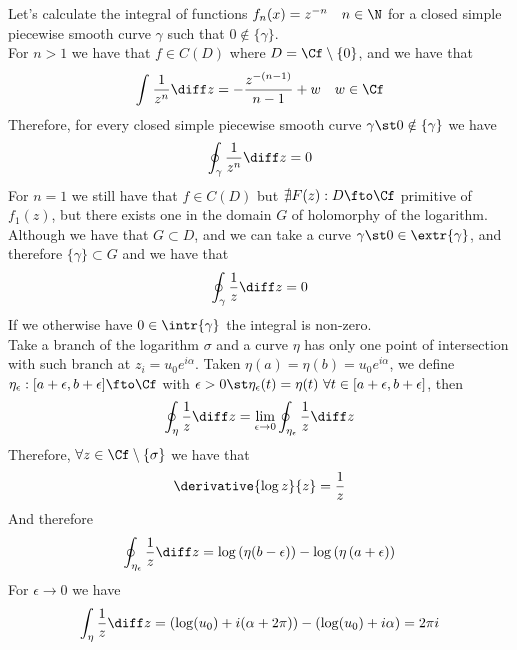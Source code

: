 \documentclass[../mmf.tex]{subfiles}
\begin{document}
\begin{eg}
	Let's calculate the integral of functions $f_n(x)=z^{-n}\quad n\in\N$ for a closed simple piecewise smooth curve $\gamma$ such that $0\notin\{\gamma\}$.\\
	For $n>1$ we have that $f\in C(D)$ where $D=\Cf\setminus\{0\}$, and we have that
	\begin{equation*}
		\int_{}^{}\frac{1}{z^n}\diff z=-\frac{z^{-(n-1)}}{n-1}+w\quad w\in\Cf
	\end{equation*}
	Therefore, for every closed simple piecewise smooth curve $\gamma\st0\notin\{\gamma\}$ we have
	\begin{equation*}
		\oint_\gamma\frac{1}{z^n}\diff z=0
	\end{equation*}
	For $n=1$ we still have that $f\in C(D)$ but $\nexists F(z):D\fto\Cf$ primitive of $f_1(z)$, but there exists one in the domain $G$ of holomorphy of the logarithm.\\
	Although we have that $G\subset D$, and we can take a curve $\gamma\st0\in\extr{\gamma}$, and therefore $\{\gamma\}\subset G$ and we have that
	\begin{equation*}
		\oint_{\gamma}\frac{1}{z}\diff z=0
	\end{equation*}
	If we otherwise have $0\in\intr{\gamma}$ the integral is non-zero.\\
	Take a branch of the logarithm $\sigma$ and a curve $\eta$ has only one point of intersection with such branch at $z_i=u_0e^{i\alpha}$. Taken $\eta(a)=\eta(b)=u_0e^{i\alpha}$, we define
	$\eta_\epsilon:[a+\epsilon,b+\epsilon]\fto\Cf$ with $\epsilon>0\st\eta_\epsilon(t)=\eta(t)\ \forall t\in[a+\epsilon,b+\epsilon]$, then
	\begin{equation*}
		\oint_\eta\frac{1}{z}\diff z=\lim_{\epsilon\to0}\oint_{\eta_\epsilon}\frac{1}{z}\diff z
	\end{equation*}
	Therefore, $\forall z\in\Cf\setminus\{\sigma\}$ we have that
	\begin{equation*}
		\derivative{\log{z}}{z}=\frac{1}{z}
	\end{equation*}
	And therefore
	\begin{equation*}
		\oint_{\eta_\epsilon}\frac{1}{z}\diff z=\log\left( \eta(b-\epsilon) \right)-\log\left( \eta\left( a+\epsilon \right) \right)
	\end{equation*}
	For $\epsilon\to0$ we have
	\begin{equation*}
		\int_{\eta}^{}\frac{1}{z}\diff z=\left( \log(u_0)+i(\alpha+2\pi) \right)-\left( \log(u_0)+i\alpha \right)=2\pi i
	\end{equation*}
\end{eg}
\end{document}

